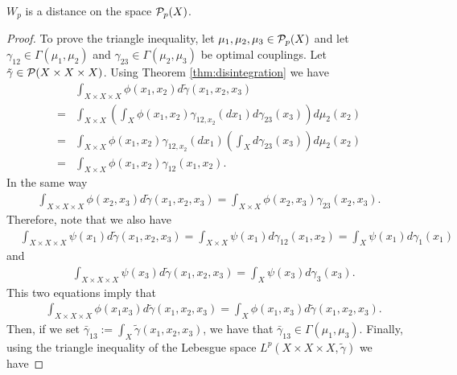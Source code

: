 \begin{proposition}
    $W_p$ is a distance on the space $ \mathcal P_p(X) $.
\end{proposition}

\begin{proof}
    To prove the triangle inequality, let $ \mu_1, \mu_2, \mu_3 \in \mathcal P_p(X) $ and let $ \gamma_{12} \in \Gamma(\mu_1, \mu_2) $ and $ \gamma_{23} \in \Gamma(\mu_2, \mu_3) $ be optimal couplings. Let $ \tilde \gamma \in \mathcal P(X \times X \times X) $. Using Theorem \ref{thm:disintegration} we have
    \begin{align*}
        &\int_{X \times X \times X} \phi(x_1, x_2) d \tilde \gamma (x_1, x_2, x_3) \\
        = &\int_{X \times X} \left(\int_X \phi(x_1, x_2) \gamma_{12,x_2} (dx_1)  d \gamma_{23}(x_3) \right) d \mu_2(x_2 ) \\
        = &\int_{X \times X} \phi(x_1, x_2) \gamma_{12,x_2} (dx_1) \left(\int_X d \gamma_{23}(x_3)\right) d \mu_2(x_2 ) \\
        = &\int_{X \times X} \phi(x_1, x_2) \gamma_{12}(x_1, x_2).
    \end{align*}
    In the same way
    \begin{align*}
        \int_{X \times X \times X} \phi(x_2, x_3) d \tilde \gamma (x_1, x_2, x_3) = \int_{X \times X} \phi(x_2, x_3) \gamma_{23}(x_2, x_3).
    \end{align*}
    Therefore, note that we also have
    \begin{align*}
        &\int_{X \times X \times X} \psi(x_1) d \tilde \gamma (x_1, x_2, x_3)  
        = \int_{X \times X} \psi(x_1) d \gamma_{12} (x_1, x_2)
        = \int_{X} \psi(x_1) d \gamma_1 (x_1)
    \end{align*}
    and
    \begin{align*}
        &\int_{X \times X \times X} \psi(x_3) d \tilde \gamma (x_1, x_2, x_3)  
        = \int_{X} \psi(x_3) d \gamma_3 (x_3).
    \end{align*}
    This two equations imply that
    \begin{align*}
        &\int_{X \times X \times X} \phi(x_1 x_3) d \tilde \gamma (x_1, x_2, x_3)  
        = \int_{X} \phi(x_1, x_3) d \tilde \gamma (x_1, x_2, x_3).
    \end{align*}
    Then, if we set $ \bar \gamma_{13} := \int_X \tilde \gamma (x_1, x_2, x_3) $, we have that $ \bar \gamma_{13} \in \Gamma(\mu_1, \mu_3)$.
    Finally, using the triangle inequality of the Lebesgue space $ L^p(X \times X \times X, \tilde \gamma) $ we have

\end{proof}
